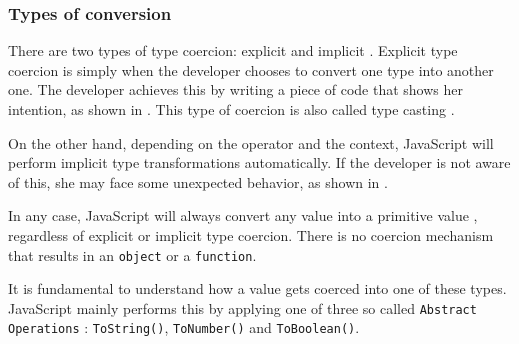 \subsubsection{Types of conversion}
\label{types_of_conversion}
There are two types of type coercion: explicit and implicit \citep{you-dont-know-js}. Explicit type coercion is simply when the developer chooses to convert one type into another one. The developer achieves this by writing a piece of code that shows her intention, as shown in . This type of coercion is also called type casting \citep{you-dont-know-js}.

\begin{code}
	\captionsetup{aboveskip=0pt, belowskip=10pt}
	\caption[Explicit JavaScript Type Coercion]{\textbf{Explicit JavaScript Type Coercion} - The developer explicitly transforms a type into another one. The return values of \texttt{String()}, \texttt{Number()} and \texttt{Boolean()} are always of type \texttt{string}, \texttt{number} and \texttt{boolean}, respectively.}
	\label{code:background-explicit-type-coercion}
  \end{code}

On the other hand, depending on the operator and the context, JavaScript will perform implicit type transformations automatically. If the developer is not aware of this, she may face some unexpected behavior, as shown in .

\begin{code}
	\captionsetup{aboveskip=0pt, belowskip=10pt}
	\caption[Implicit JavaScript Type Coercion]{\textbf{Implicit JavaScript Type Coercion} - Examples given by Douglas Crockford in his talk `JavaScript: The Good Parts' at Google\footnote{https://www.youtube.com/watch?v=hQVTIJBZook}.}
	\label{code:background-implicit-type-coercion}
\end{code}

In any case, JavaScript will always convert any value into a primitive value \citep{ecma-script}, regardless of explicit or implicit type coercion. There is no coercion mechanism that results in an \texttt{object} or a \texttt{function}.

It is fundamental to understand how a value gets coerced into one of these types. JavaScript mainly performs this by applying one of three so called \texttt{Abstract Operations} \citep{ecma-script}: \texttt{ToString()}, \texttt{ToNumber()} and \texttt{ToBoolean()}.

